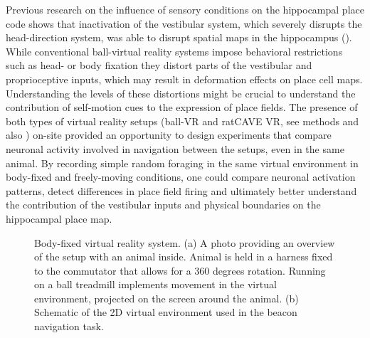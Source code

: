 Previous research on the influence of sensory conditions on the hippocampal place code shows that inactivation of the vestibular system, which severely disrupts the head-direction system, was able to disrupt spatial maps in the hippocampus (\cite{Stackman2002}). While conventional ball-virtual reality systems impose behavioral restrictions such as head- or body fixation they distort parts of the vestibular and proprioceptive inputs, which may result in deformation effects on place cell maps. Understanding the levels of these distortions might be crucial to understand the contribution of self-motion cues to the expression of place fields. The presence of both types of virtual reality setups (ball-VR and ratCAVE VR, see methods and also \cite{Thurley2014}) on-site provided an opportunity to design experiments that compare neuronal activity involved in navigation between the setups, even in the same animal. By recording simple random foraging in the same virtual environment in body-fixed and freely-moving conditions, one could compare neuronal activation patterns, detect differences in place field firing and ultimately better understand the contribution of the vestibular inputs and physical boundaries on the hippocampal place map.

\begin{figure}
\captionsetup{format=plain}
\caption[Ball virtual reality setup]{
Body-fixed virtual reality system. (a) A photo providing an overview of the setup with an animal inside. Animal is held in a harness fixed to the commutator that allows for a 360 degrees rotation. Running on a ball treadmill implements movement in the virtual environment, projected on the screen around the animal. (b) Schematic of the 2D virtual environment used in the beacon navigation task.
}
\label{fig:F9_ball_VR}
\end{figure}

